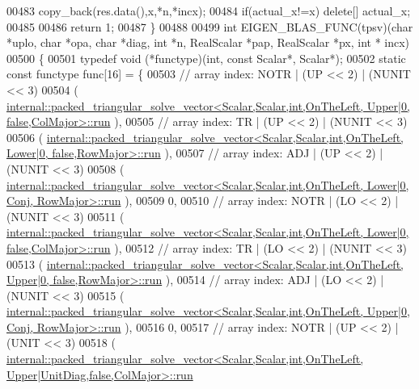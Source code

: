 \begin{DoxyCode}
00483   copy\_back(res.data(),x,*n,*incx);
00484   \textcolor{keywordflow}{if}(actual\_x!=x) \textcolor{keyword}{delete}[] actual\_x;
00485 
00486   \textcolor{keywordflow}{return} 1;
00487 \}
00488 
00499 \textcolor{keywordtype}{int} EIGEN\_BLAS\_FUNC(tpsv)(\textcolor{keywordtype}{char} *uplo, \textcolor{keywordtype}{char} *opa, \textcolor{keywordtype}{char} *diag, \textcolor{keywordtype}{int} *n, RealScalar *pap, RealScalar *px, \textcolor{keywordtype}{int} *
      incx)
00500 \{
00501   \textcolor{keyword}{typedef} void (*functype)(int, \textcolor{keyword}{const} Scalar*, Scalar*);
00502   \textcolor{keyword}{static} \textcolor{keyword}{const} functype func[16] = \{
00503     \textcolor{comment}{// array index: NOTR  | (UP << 2) | (NUNIT << 3)}
00504     (
      \hyperlink{structinternal_1_1packed__triangular__solve__vector}{internal::packed\_triangular\_solve\_vector<Scalar,Scalar,int,OnTheLeft, Upper|0,       false,ColMajor>::run}
      ),
00505     \textcolor{comment}{// array index: TR    | (UP << 2) | (NUNIT << 3)}
00506     (
      \hyperlink{structinternal_1_1packed__triangular__solve__vector}{internal::packed\_triangular\_solve\_vector<Scalar,Scalar,int,OnTheLeft, Lower|0,       false,RowMajor>::run}
      ),
00507     \textcolor{comment}{// array index: ADJ   | (UP << 2) | (NUNIT << 3)}
00508     (
      \hyperlink{structinternal_1_1packed__triangular__solve__vector}{internal::packed\_triangular\_solve\_vector<Scalar,Scalar,int,OnTheLeft, Lower|0,       Conj, RowMajor>::run}
      ),
00509     0,
00510     \textcolor{comment}{// array index: NOTR  | (LO << 2) | (NUNIT << 3)}
00511     (
      \hyperlink{structinternal_1_1packed__triangular__solve__vector}{internal::packed\_triangular\_solve\_vector<Scalar,Scalar,int,OnTheLeft, Lower|0,       false,ColMajor>::run}
      ),
00512     \textcolor{comment}{// array index: TR    | (LO << 2) | (NUNIT << 3)}
00513     (
      \hyperlink{structinternal_1_1packed__triangular__solve__vector}{internal::packed\_triangular\_solve\_vector<Scalar,Scalar,int,OnTheLeft, Upper|0,       false,RowMajor>::run}
      ),
00514     \textcolor{comment}{// array index: ADJ   | (LO << 2) | (NUNIT << 3)}
00515     (
      \hyperlink{structinternal_1_1packed__triangular__solve__vector}{internal::packed\_triangular\_solve\_vector<Scalar,Scalar,int,OnTheLeft, Upper|0,       Conj, RowMajor>::run}
      ),
00516     0,
00517     \textcolor{comment}{// array index: NOTR  | (UP << 2) | (UNIT  << 3)}
00518     (
      \hyperlink{structinternal_1_1packed__triangular__solve__vector}{internal::packed\_triangular\_solve\_vector<Scalar,Scalar,int,OnTheLeft, Upper|UnitDiag,false,ColMajor>::run}

\end{DoxyCode}
